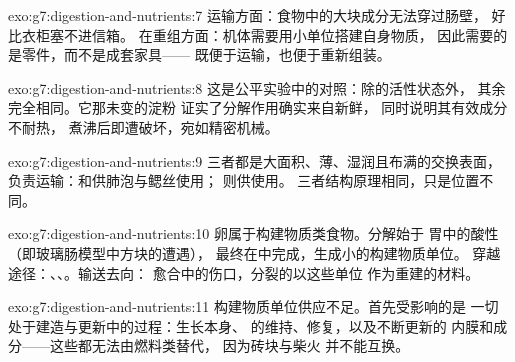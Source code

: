 \begin{solution}{exo:g7:digestion-and-nutrients:7}
运输方面：食物中的大块成分无法穿过肠壁，
好比衣柜塞不进信箱。
在重组方面：机体需要用小单位搭建自身物质，
因此需要的是零件，而不是成套家具——
既便于运输，也便于重新组装。
\end{solution}

\begin{solution}{exo:g7:digestion-and-nutrients:8}
这是公平实验中的对照：除的活性状态外，
其余完全相同。它那未变的淀粉
证实了分解作用确实来自新鲜，
同时说明其有效成分不耐热，
煮沸后即遭破坏，宛如精密机械。
\end{solution}

\begin{solution}{exo:g7:digestion-and-nutrients:9}
三者都是大面积、薄、湿润且布满的交换表面，
负责运输：和供肺泡与鳃丝使用；
则供使用。
三者结构原理相同，只是位置不同。
\end{solution}

\begin{solution}{exo:g7:digestion-and-nutrients:10}
卵属于构建物质类食物。分解始于
胃中的酸性（即玻璃肠模型中方块的遭遇），
最终在中完成，生成小的构建物质单位。
穿越途径：、、。输送去向：
愈合中的伤口，分裂的以这些单位
作为重建的材料。
\end{solution}

\begin{solution}{exo:g7:digestion-and-nutrients:11}
构建物质单位供应不足。首先受影响的是
一切处于建造与更新中的过程：生长本身、
的维持、修复，以及不断更新的
内膜和成分——这些都无法由燃料类替代，
因为砖块与柴火
并不能互换。
\end{solution}

